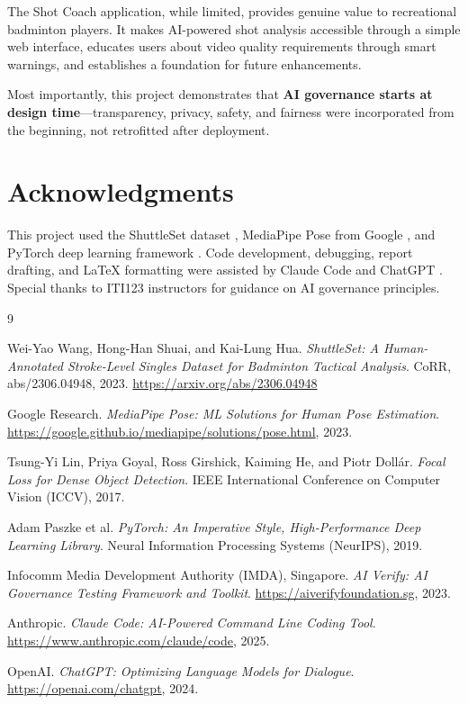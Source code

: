 \documentclass[12pt,a4paper]{article}
\begin{document}
The Shot Coach application, while limited, provides genuine value to recreational badminton players. It makes AI-powered shot analysis accessible through a simple web interface, educates users about video quality requirements through smart warnings, and establishes a foundation for future enhancements.

Most importantly, this project demonstrates that \textbf{AI governance starts at design time}---transparency, privacy, safety, and fairness were incorporated from the beginning, not retrofitted after deployment.

\section*{Acknowledgments}

This project used the ShuttleSet dataset \cite{ShuttleSet}, MediaPipe Pose from Google \cite{MediaPipe}, and PyTorch deep learning framework \cite{PyTorch}. Code development, debugging, report drafting, and LaTeX formatting were assisted by Claude Code \cite{ClaudeCode} and ChatGPT \cite{ChatGPT}. Special thanks to ITI123 instructors for guidance on AI governance principles.

\begin{thebibliography}{9}

Wei-Yao Wang, Hong-Han Shuai, and Kai-Lung Hua.
\textit{ShuttleSet: A Human-Annotated Stroke-Level Singles Dataset for Badminton Tactical Analysis}.
CoRR, abs/2306.04948, 2023.
\url{https://arxiv.org/abs/2306.04948}

Google Research.
\textit{MediaPipe Pose: ML Solutions for Human Pose Estimation}.
\url{https://google.github.io/mediapipe/solutions/pose.html}, 2023.

Tsung-Yi Lin, Priya Goyal, Ross Girshick, Kaiming He, and Piotr Dollár.
\textit{Focal Loss for Dense Object Detection}.
IEEE International Conference on Computer Vision (ICCV), 2017.

Adam Paszke et al.
\textit{PyTorch: An Imperative Style, High-Performance Deep Learning Library}.
Neural Information Processing Systems (NeurIPS), 2019.

Infocomm Media Development Authority (IMDA), Singapore.
\textit{AI Verify: AI Governance Testing Framework and Toolkit}.
\url{https://aiverifyfoundation.sg}, 2023.

Anthropic.
\textit{Claude Code: AI-Powered Command Line Coding Tool}.
\url{https://www.anthropic.com/claude/code}, 2025.

OpenAI.
\textit{ChatGPT: Optimizing Language Models for Dialogue}.
\url{https://openai.com/chatgpt}, 2024.

\end{thebibliography}
\end{document}
